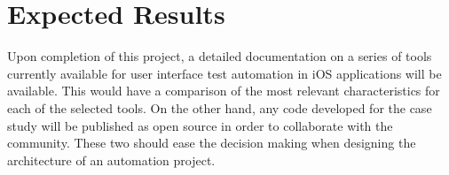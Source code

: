 \section{Expected Results}
Upon completion of this project, a detailed documentation on a series of tools currently available for user interface test automation in iOS applications will be available. This would have a comparison of the most relevant characteristics for each of the selected tools. On the other hand, any code developed for the case study will be published as open source in order to collaborate with the community. These two should ease the decision making when designing the architecture of an automation project.